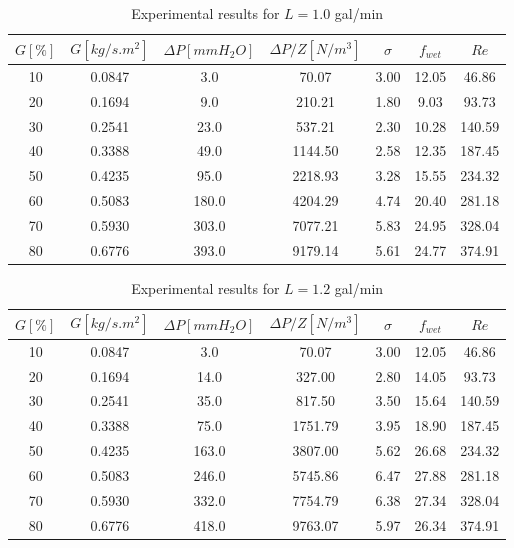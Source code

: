 \begin{table}[H]
    \centering
    \caption{Experimental results for $L=1.0$ gal/min}
    \begin{tabular}{ccccccc}
        \hline
        $G [\%]$ & $G [kg/s.m^2]$ & $\Delta P [mmH_2O]$ & $\Delta P/Z [N/m^3]$ & $\sigma$ & $f_{wet}$ & $Re$ \\
        \hline
        10 & 0.0847 & 3.0 & 70.07 & 3.00 & 12.05 & 46.86 \\
        20 & 0.1694 & 9.0 & 210.21 & 1.80 & 9.03 & 93.73 \\
        30 & 0.2541 & 23.0 & 537.21 & 2.30 & 10.28 & 140.59 \\
        40 & 0.3388 & 49.0 & 1144.50 & 2.58 & 12.35 & 187.45 \\
        50 & 0.4235 & 95.0 & 2218.93 & 3.28 & 15.55 & 234.32 \\
        60 & 0.5083 & 180.0 & 4204.29 & 4.74 & 20.40 & 281.18 \\
        70 & 0.5930 & 303.0 & 7077.21 & 5.83 & 24.95 & 328.04 \\
        80 & 0.6776 & 393.0 & 9179.14 & 5.61 & 24.77 & 374.91 \\
        \hline
    \end{tabular}
\end{table}

\begin{table}[H]
    \centering
    \caption{Experimental results for $L=1.2$ gal/min}
    \begin{tabular}{ccccccc}
        \hline
        $G [\%]$ & $G [kg/s.m^2]$ & $\Delta P [mmH_2O]$ & $\Delta P/Z [N/m^3]$ & $\sigma$ & $f_{wet}$ & $Re$ \\
        \hline
        10 & 0.0847 & 3.0 & 70.07 & 3.00 & 12.05 & 46.86 \\
        20 & 0.1694 & 14.0 & 327.00 & 2.80 & 14.05 & 93.73 \\
        30 & 0.2541 & 35.0 & 817.50 & 3.50 & 15.64 & 140.59 \\
        40 & 0.3388 & 75.0 & 1751.79 & 3.95 & 18.90 & 187.45 \\
        50 & 0.4235 & 163.0 & 3807.00 & 5.62 & 26.68 & 234.32 \\
        60 & 0.5083 & 246.0 & 5745.86 & 6.47 & 27.88 & 281.18 \\
        70 & 0.5930 & 332.0 & 7754.79 & 6.38 & 27.34 & 328.04 \\
        80 & 0.6776 & 418.0 & 9763.07 & 5.97 & 26.34 & 374.91 \\
        \hline
    \end{tabular}
\end{table}

